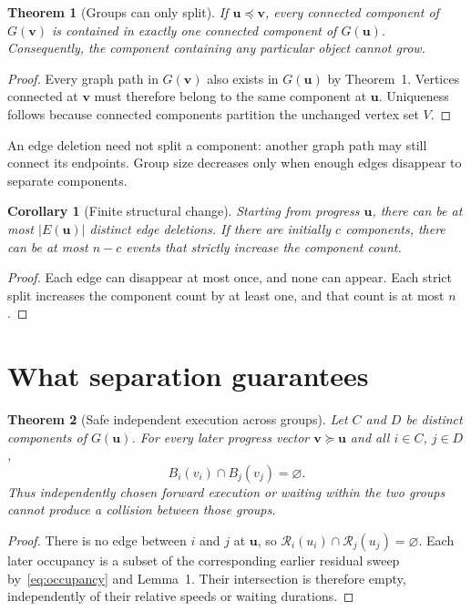 \documentclass[11pt,a4paper]{article}
\newtheorem{theorem}{Theorem}
\newtheorem{corollary}{Corollary}
\theoremstyle{remark}
\newcommand{\remSweep}{\mathcal R}
\newcommand{\up}{\boldsymbol u}
\newcommand{\vp}{\boldsymbol v}
\begin{document}
\begin{theorem}[Groups can only split]
If $\up\preceq\vp$, every connected component of $G(\vp)$ is contained in
exactly one connected component of $G(\up)$. Consequently, the component
containing any particular object cannot grow.
\end{theorem}
\begin{proof}
Every graph path in $G(\vp)$ also exists in $G(\up)$ by Theorem~1. Vertices
connected at $\vp$ must therefore belong to the same component at $\up$.
Uniqueness follows because connected components partition the unchanged
vertex set $V$.
\end{proof}

An edge deletion need not split a component: another graph path may still
connect its endpoints. Group size decreases only when enough edges disappear
to separate components.

\begin{corollary}[Finite structural change]
Starting from progress $\up$, there can be at most $|E(\up)|$ distinct edge
deletions. If there are initially $c$ components, there can be at most $n-c$
events that strictly increase the component count.
\end{corollary}
\begin{proof}
Each edge can disappear at most once, and none can appear. Each strict split
increases the component count by at least one, and that count is at most $n$.
\end{proof}

\section{What separation guarantees}

\begin{theorem}[Safe independent execution across groups]
Let $C$ and $D$ be distinct components of $G(\up)$. For every later progress
vector $\vp\succeq\up$ and all $i\in C$, $j\in D$,
\begin{equation}
 B_i(v_i)\cap B_j(v_j)=\varnothing.
 \label{eq:independent-safety}
\end{equation}
Thus independently chosen forward execution or waiting within the two groups
cannot produce a collision between those groups.
\end{theorem}
\begin{proof}
There is no edge between $i$ and $j$ at $\up$, so
$\remSweep_i(u_i)\cap\remSweep_j(u_j)=\varnothing$.
Each later occupancy is a subset of the corresponding earlier residual
sweep by~\eqref{eq:occupancy} and Lemma~1. Their intersection is therefore
empty, independently of their relative speeds or waiting durations.
\end{proof}
\end{document}
